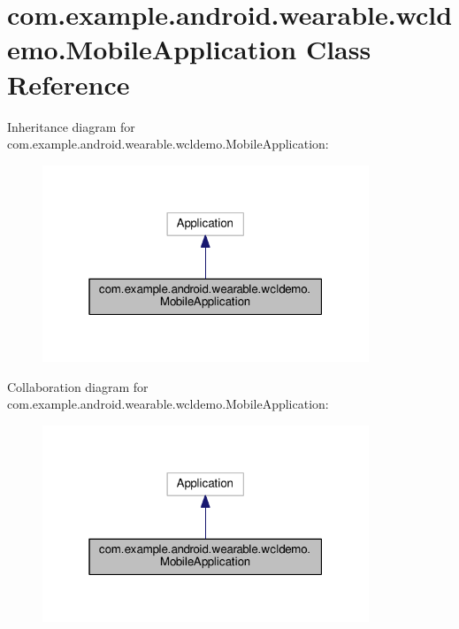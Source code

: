 \hypertarget{classcom_1_1example_1_1android_1_1wearable_1_1wcldemo_1_1MobileApplication}{}\section{com.\+example.\+android.\+wearable.\+wcldemo.\+Mobile\+Application Class Reference}
\label{classcom_1_1example_1_1android_1_1wearable_1_1wcldemo_1_1MobileApplication}


Inheritance diagram for com.\+example.\+android.\+wearable.\+wcldemo.\+Mobile\+Application\+:\nopagebreak
\begin{figure}[H]
\begin{center}
\leavevmode
\includegraphics[width=277pt]{d3/da9/classcom_1_1example_1_1android_1_1wearable_1_1wcldemo_1_1MobileApplication__inherit__graph}
\end{center}
\end{figure}


Collaboration diagram for com.\+example.\+android.\+wearable.\+wcldemo.\+Mobile\+Application\+:\nopagebreak
\begin{figure}[H]
\begin{center}
\leavevmode
\includegraphics[width=277pt]{d3/d40/classcom_1_1example_1_1android_1_1wearable_1_1wcldemo_1_1MobileApplication__coll__graph}
\end{center}
\end{figure}

